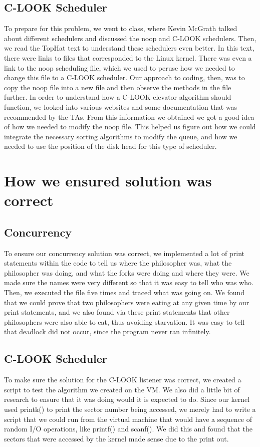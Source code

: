 \documentclass[letterpaper,10pt,titlepage]{article}
\begin{document}
\subsection{C-LOOK Scheduler}
To prepare for this problem, we went to class, where Kevin McGrath talked about different schedulers and discussed the noop and C-LOOK schedulers. Then, we read the TopHat text to understand these schedulers even better. In this text, there were links to files that corresponded to the Linux kernel. There was even a link to the noop scheduling file, which we used to peruse how we needed to change this file to a C-LOOK scheduler. Our approach to coding, then, was to copy the noop file into a new file and then observe the methods in the file further. In order to understand how a C-LOOK elevator algorithm should function, we looked into various websites and some documentation that was recommended by the TAs. From this information we obtained we got a good idea of how we needed to modify the noop file. This helped us figure out how we could integrate the necessary sorting algorithms to modify the queue, and how we needed to use the position of the disk head for this type of scheduler.

\section{How we ensured solution was correct}
\subsection{Concurrency}
To ensure our concurrency solution was correct, we implemented a lot of print statements within the code to tell us where the philosopher was, what the philosopher was doing, and what the forks were doing and where they were. We made sure the names were very different so that it was easy to tell who was who. Then, we executed the file five times and traced what was going on. We found that we could prove that two philosophers were eating at any given time by our print statements, and we also found via these print statements that other philosophers were also able to eat, thus avoiding starvation. It was easy to tell that deadlock did not occur, since the program never ran infinitely.  

\subsection{C-LOOK Scheduler}
To make sure the solution for the C-LOOK listener was correct, we created a script to test the algorithm we created on the VM. We also did a little bit of research to ensure that it was doing would it is expected to do. Since our kernel used printk() to print the sector number being accessed, we merely had to write a script that we could run from the virtual machine that would have a sequence of random I/O operations, like printf() and scanf(). We did this and found that the sectors that were accessed by the kernel made sense due to the print out.
\end{document}
